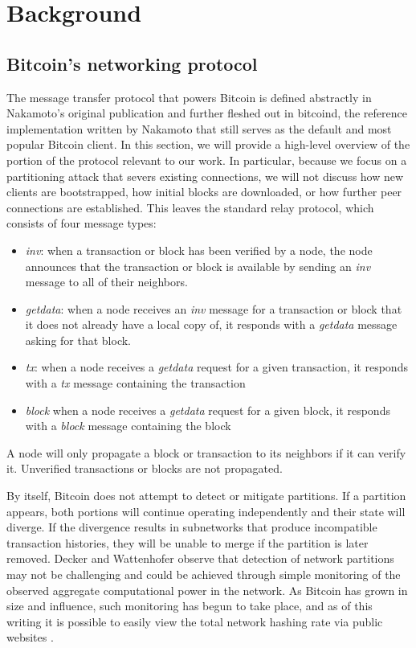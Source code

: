 \section{Background}
\subsection{Bitcoin's networking protocol}
The message transfer protocol that powers Bitcoin is defined abstractly in Nakamoto's original publication \cite{Nakamoto} and further fleshed out in bitcoind, the reference implementation written by Nakamoto that still serves as the default and most popular Bitcoin client. In this section, we will provide a high-level overview of the portion of the protocol relevant to our work. In particular, because we focus on a partitioning attack that severs existing connections, we will not discuss how new clients are bootstrapped, how initial blocks are downloaded, or how further peer connections are established. This leaves the standard relay protocol, which consists of four message types:

\begin{itemize}

\item \textit{inv}: when a transaction or block has been verified by a node, the node announces that the transaction or block is available by sending an \textit{inv} message to all of their neighbors.
\item \textit{getdata}: when a node receives an \textit{inv} message for a transaction or block that it does not already have a local copy of, it responds with a \textit{getdata} message asking for that block.
\item \textit{tx}: when a node receives a \textit{getdata} request for a given transaction, it responds with a \textit{tx} message containing the transaction
\item \textit{block} when a node receives a \textit{getdata} request for a given block, it responds with a \textit{block} message containing the block

\end{itemize}

A node will only propagate a block or transaction to its neighbors if it can verify it. Unverified transactions or blocks are not propagated.

By itself, Bitcoin does not attempt to detect or mitigate partitions. If a partition appears, both portions will continue operating independently and their state will diverge. If the divergence results in subnetworks that produce incompatible transaction histories, they will be unable to merge if the partition is later removed. Decker and Wattenhofer \cite{DeckerWattenhofer2013} observe that detection of network partitions may not be challenging and could be achieved through simple monitoring of the observed aggregate computational power in the network. As Bitcoin has grown in size and influence, such monitoring has begun to take place, and as of this writing it is possible to easily view the total network hashing rate via public websites \cite{sipa}.

